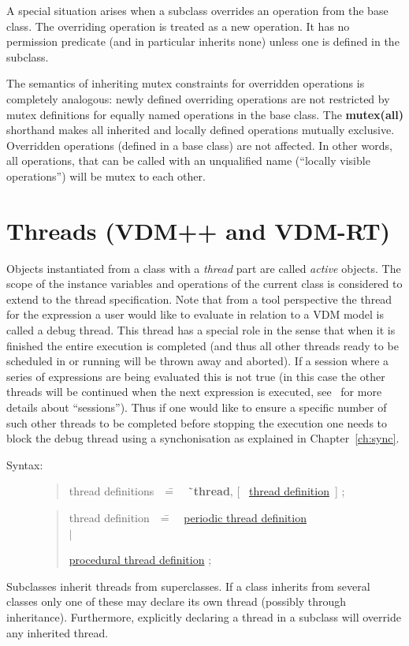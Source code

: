 \documentclass{overturerepchap}
\newcommand{\Rule}[2]{
  \begin{quote}\begin{tabbing}
    #1\index{#1}\ \ \= = \ \ \= #2  ; %
    
  \end{tabbing}\end{quote}
  }
\newcommand{\RuleTarget}[1]{\hypertarget{rule:#1}{}}
\newcommand{\Ruledef}[2]
{
  \RuleTarget{#1}\Rule{#1}{#2}%
  }
\newcommand{\Ruleref}[1]{
  \hyperlink{rule:#1}{#1}}
\newcommand{\dsep}{\\ \> $|$ \>}
\newcommand{\Lop}[1]{`{\bf\ttfamily #1}\Quote}
\newcommand{\keyw}[1]{{\bf\ttfamily #1}}
\newcommand{\OptPt}[1]{[\ #1\ ]}
\begin{document}
A special situation arises when a subclass overrides an
operation from the base class. The overriding operation is
treated as a new operation.  It has no permission predicate (and in
particular inherits none) unless one is defined in the subclass.

The semantics of inheriting mutex constraints for overridden
operations is completely analogous: newly defined overriding
operations are not restricted by mutex definitions for equally named
operations in the base class. The \keyw{mutex(all)} shorthand makes all
inherited and locally defined operations mutually
exclusive. Overridden operations (defined in a base class) are not
affected. In other words, all operations, that can be called with an
unqualified name (``locally visible operations'') will be mutex to
each other.

\chapter{Threads (VDM++ and VDM-RT)}\label{ch:thread}

Objects instantiated from a class with a {\em thread} part are called
{\em active} objects.  The scope of the instance variables and
operations of the current class is considered to extend to the thread
specification. Note that from a tool perspective the thread for the
expression a user would like to evaluate in relation to a VDM model is
called a debug thread. This thread has a special role in the sense
that when it is finished the entire execution is completed (and thus
all other threads ready to be scheduled in or running will be thrown
away and aborted). If a session where a series of expressions are
being evaluated this is not true (in this case the other threads will
be continued when the next expression is executed,
see~\cite{Larsen&13a} for more details about ``sessions'').
Thus if one would like to ensure a specific number
of such other threads to be completed before stopping the execution
one needs to block the debug thread using a synchonisation as
explained in Chapter~\ref{ch:sync}.

\begin{description}
\item[Syntax:]  \Ruledef{thread definitions}{ \Lop{thread},
\OptPt{\Ruleref{thread definition}} } \Rule{thread definition}{
    \Ruleref{periodic thread definition} \dsep 
    \Ruleref{procedural thread definition} }
\end{description}

Subclasses inherit threads from superclasses. 
If a class inherits from several classes only one of these may declare
its own thread (possibly through inheritance). Furthermore, explicitly
declaring a thread in a subclass will override any inherited thread.  
\end{document}
